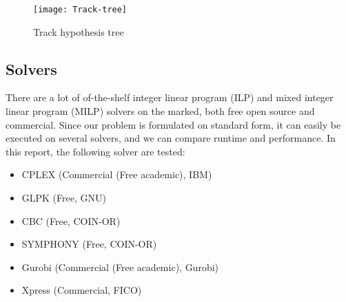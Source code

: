 \begin{figure}
\centering
\texttt{[image: Track-tree]}
\caption{Track hypothesis tree}
\label{fig:hyp-tree}
\end{figure}

\subsection{Solvers}
There are a lot of of-the-shelf integer linear program (ILP) and mixed integer linear program (MILP) solvers on the marked, both free open source and commercial. Since our problem is formulated on standard form, it can easily be executed on several solvers, and we can compare runtime and performance. In this report, the following solver are tested:
\begin{itemize}
\item CPLEX 	(Commercial (Free academic),  IBM)
\item GLPK 		(Free, GNU)
\item CBC 		(Free, COIN-OR)
\item SYMPHONY	(Free, COIN-OR)
\item Gurobi 	(Commercial (Free academic), Gurobi)
\item Xpress	(Commercial, FICO)
\end{itemize}

















